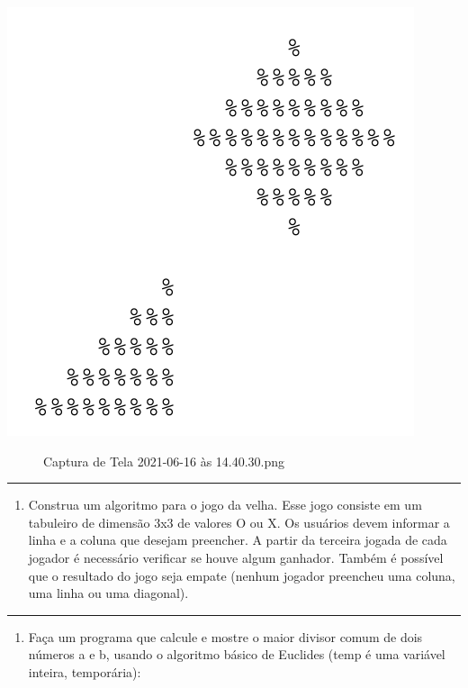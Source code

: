 \documentclass[12pt,a4paper]{article}
\renewcommand{\linethickness}{0.05em}
\providecommand{\tightlist}{%
      \setlength{\itemsep}{0pt}\setlength{\parskip}{0pt}}
\begin{document}
\includegraphics{"figs/cap4ex1.png"}

    \begin{figure}
\centering
\caption{Captura de Tela 2021-06-16 às 14.40.30.png}
\end{figure}

    \begin{center}\rule{0.5\linewidth}{\linethickness}\end{center}

\begin{enumerate}
\def\labelenumi{\arabic{enumi}.}
\setcounter{enumi}{11}
\tightlist
\item
  Construa um algoritmo para o jogo da velha. Esse jogo consiste em um
  tabuleiro de dimensão 3x3 de valores O ou X. Os usuários devem
  informar a linha e a coluna que desejam preencher. A partir da
  terceira jogada de cada jogador é necessário verificar se houve algum
  ganhador. Também é possível que o resultado do jogo seja empate
  (nenhum jogador preencheu uma coluna, uma linha ou uma diagonal).
\end{enumerate}

    \begin{center}\rule{0.5\linewidth}{\linethickness}\end{center}

\begin{enumerate}
\def\labelenumi{\arabic{enumi}.}
\setcounter{enumi}{12}
\tightlist
\item
  Faça um programa que calcule e mostre o maior divisor comum de dois
  números a e b, usando o algoritmo básico de Euclides (temp é uma
  variável inteira, temporária):
\end{enumerate}
\end{document}
